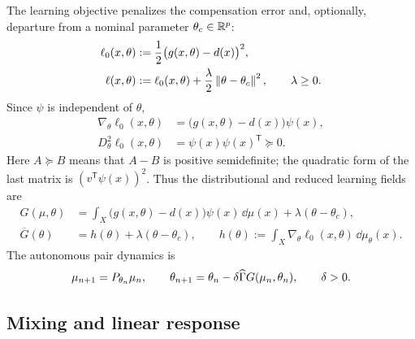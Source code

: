 The learning objective penalizes the compensation error and, optionally,
departure from a nominal parameter $\theta_c\in\mathbb{R}^p$:
\begin{align}
  \ell_0(x,\theta)&:=\frac12\bigl(g(x,\theta)-d(x)\bigr)^2,
  \label{eq:duffing-compensation-loss}\\
  \ell(x,\theta)&:=\ell_0(x,\theta)
    +\frac\lambda2\left\lVert \theta-\theta_c\right\rVert^2,\qquad \lambda\ge0.
  \label{eq:duffing-regularized-loss}
\end{align}
Since $\psi$ is independent of $\theta$,
\begin{align}
  \nabla_\theta\ell_0(x,\theta)
    &=\bigl(g(x,\theta)-d(x)\bigr)\psi(x),
  \label{eq:duffing-grad-loss}\\
  D_\theta^2\ell_0(x,\theta)&=\psi(x)\psi(x)^{\mathsf T}\succeq0.
  \label{eq:duffing-hessian-loss}
\end{align}
Here $A\succeq B$ means that $A-B$ is positive semidefinite;
the quadratic form of the last matrix is $(v^{\mathsf T}\psi(x))^2$.
Thus the distributional and reduced learning fields are
\begin{align}
  G(\mu,\theta)
    &=\int_X\bigl(g(x,\theta)-d(x)\bigr)\psi(x)\,\dd\mu(x)
      +\lambda(\theta-\theta_c),
  \label{eq:duffing-learning-field-explicit}\\
  \overline G(\theta)&=h(\theta)+\lambda(\theta-\theta_c),
  \qquad h(\theta):=\int_X\nabla_\theta\ell_0(x,\theta)\,\dd\mu_\theta(x).
  \label{eq:duffing-reduced-field}
\end{align}
The autonomous pair dynamics is
\begin{equation}
  \mu_{n+1}=P_{\theta_n}\mu_n,
  \qquad \theta_{n+1}=\theta_n-\delta\widehat{\Gamma} G(\mu_n,\theta_n),
  \qquad \delta>0.
  \label{eq:duffing-parameter-update}
\end{equation}

\subsection{Mixing and linear response}

